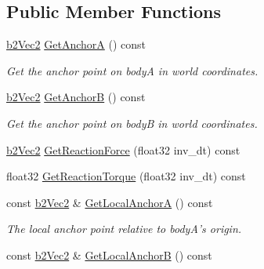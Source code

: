 \subsection*{Public Member Functions}
\begin{DoxyCompactItemize}
\item 
\hypertarget{classb2_distance_joint_a66c1cb4deff1166c1dab67df6047a89c}{\hyperlink{structb2_vec2}{b2\-Vec2} \hyperlink{classb2_distance_joint_a66c1cb4deff1166c1dab67df6047a89c}{Get\-Anchor\-A} () const }\label{classb2_distance_joint_a66c1cb4deff1166c1dab67df6047a89c}

\begin{DoxyCompactList}\small\item\em Get the anchor point on body\-A in world coordinates. \end{DoxyCompactList}\item 
\hypertarget{classb2_distance_joint_afc58d85cf7cc5e23082cf469e1a1a067}{\hyperlink{structb2_vec2}{b2\-Vec2} \hyperlink{classb2_distance_joint_afc58d85cf7cc5e23082cf469e1a1a067}{Get\-Anchor\-B} () const }\label{classb2_distance_joint_afc58d85cf7cc5e23082cf469e1a1a067}

\begin{DoxyCompactList}\small\item\em Get the anchor point on body\-B in world coordinates. \end{DoxyCompactList}\item 
\hyperlink{structb2_vec2}{b2\-Vec2} \hyperlink{classb2_distance_joint_a99413cc114b2f4dc4ce7693c062ce226}{Get\-Reaction\-Force} (float32 inv\-\_\-dt) const 
\item 
float32 \hyperlink{classb2_distance_joint_a8d65840abe0b398399020524852788fd}{Get\-Reaction\-Torque} (float32 inv\-\_\-dt) const 
\item 
\hypertarget{classb2_distance_joint_a75a41c40f21e48a6f9e947dd1dc46db4}{const \hyperlink{structb2_vec2}{b2\-Vec2} \& \hyperlink{classb2_distance_joint_a75a41c40f21e48a6f9e947dd1dc46db4}{Get\-Local\-Anchor\-A} () const }\label{classb2_distance_joint_a75a41c40f21e48a6f9e947dd1dc46db4}

\begin{DoxyCompactList}\small\item\em The local anchor point relative to body\-A's origin. \end{DoxyCompactList}\item 
\hypertarget{classb2_distance_joint_a22e9572c8b3d1f0619b340738811c082}{const \hyperlink{structb2_vec2}{b2\-Vec2} \& \hyperlink{classb2_distance_joint_a22e9572c8b3d1f0619b340738811c082}{Get\-Local\-Anchor\-B} () const }\label{classb2_distance_joint_a22e9572c8b3d1f0619b340738811c082}


\end{DoxyCompactItemize}
